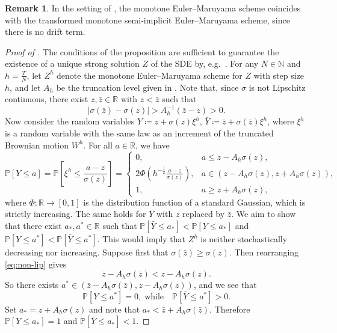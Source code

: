 \documentclass[onseside, final]{amsart}
\theoremstyle{definition}
\newtheorem{remark}[theorem]{Remark}
\newcommand{\N}{\mathbb N}
\newcommand{\R}{\mathbb R}
\renewcommand{\P}{\mathbb P} %
\numberwithin{equation}{section}
\begin{document}
		\begin{remark}
			In the setting of , the monotone Euler--Maruyama scheme coincides with the transformed monotone semi-implicit Euler--Maruyama scheme, since there is no drift term.
		\end{remark}
		
		\begin{proof}[Proof of ]
			The conditions of the proposition are sufficient to guarantee the existence of a unique strong solution $Z$ of the SDE by, e.g.~\citep[Theorem 4]{Zv74}. For any $N \in \N$ and $h = {\frac TN}$, let $Z^h$ denote the monotone Euler--Maruyama scheme for $Z$ with step size $h$, and let $A_h$ be the truncation level given in . Note that, since $\sigma$ is not Lipschitz continuous, there exist $z, \bar z \in \R$ with $z < \bar z$ such that
			\begin{equation}\label{eq:non-lip}
				|\sigma(\bar z) - \sigma(z)| > A_h^{-1}(\bar z - z) > 0.
			\end{equation}
			Now consider the random variables $Y \coloneqq z + \sigma(z)\xi^h$, $\bar Y \coloneqq \bar z + \sigma(\bar z)\xi^h$, where $\xi^h$ is a random variable with the same law as an increment of the truncated Brownian motion $W^h$. For all $a \in \R$, we have
			\begin{equation}
				\P[Y \leq a] = \P\!\left[\xi^h \leq \frac{a - z}{\sigma(z)}\right]\! = \begin{cases}
					0, & a \leq z - A_h \sigma(z),\\
					2\Phi\!\left(h^{-\frac12}\frac{a - z}{\sigma(z)}\right)\!, & a \in (z - A_h\sigma(z), z + A_h\sigma(z)),\\
					1, & a \geq z + A_h \sigma(z),
				\end{cases}
			\end{equation}
			where $\Phi\colon \R \to [0, 1]$ is the distribution function of a standard Gaussian, which is strictly increasing. The same holds for $\bar Y$ with $z$ replaced by $\bar z$. We aim to show that there exist $a_\ast, a^\ast \in \R$ such that $\P[\bar Y \leq a_\ast] < \P[Y \leq a_\ast]$ and $\P[Y \leq a^\ast] < \P[\bar Y \leq a^\ast]$. This would imply that $Z^h$ is neither stochastically decreasing nor increasing. Suppose first that $\sigma(\bar z) \ge \sigma(z)$. Then rearranging \eqref{eq:non-lip} gives
			\begin{equation}
				\bar z - A_h\sigma(\bar z) < z - A_h \sigma(z).
			\end{equation}
			So there exists $a^\ast \in (\bar z - A_h \sigma(\bar z), z - A_h \sigma(z))$, and we see that
			\begin{equation}
				\P[Y \leq a^\ast] = 0, \; \text{while} \quad \P[\bar Y \leq a^\ast] > 0.
			\end{equation}
			Set $a_\ast = z + A_h \sigma( z)$ and note that $a_\ast <  \bar z + A_h \sigma(\bar z)$. Therefore $\P[Y \leq a_\ast]= 1$ and $\P[\bar Y \leq a_\ast] < 1$.
			

\end{proof}
\end{document}
